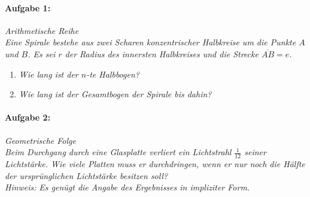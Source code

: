 
\paragraph{Aufgabe 1: } \emph{Arithmetische Reihe}\\[0.2cm]
\emph{Eine Spirale bestehe aus zwei Scharen konzentrischer Halbkreise um die Punkte $A$ und $B$. Es sei $r$ der Radius des innersten Halbkreises und die Strecke $\overline{AB}=e$.}
\begin{enumerate}[label=(\alph*)]\setlength{\itemsep}{-0.5ex}
\item \emph{Wie lang ist der $n$-te Halbbogen?}
\item \emph{Wie lang ist der Gesamtbogen der Spirale bis dahin?}
\end{enumerate}
\begin{figure}[htp]
    \centering
    \vspace{-0.5cm}
\end{figure}
%
\paragraph{Aufgabe 2: } \emph{Geometrische Folge}\\[0.2cm]
\emph{Beim Durchgang durch eine Glasplatte verliert ein Lichtstrahl $\textstyle\frac{1}{12}$ seiner Lichtstärke. Wie viele Platten muss er durchdringen, wenn er nur noch die Hälfte der ursprünglichen Lichtstärke besitzen soll?}\\[0.2cm]
\emph{Hinweis:} \emph{Es genügt die Angabe des Ergebnisses in impliziter Form.}
%
